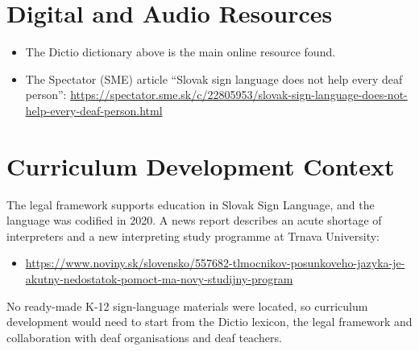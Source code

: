 \documentclass[12pt]{article}
\begin{document}
\section{Digital and Audio Resources}
\begin{itemize}
\item The Dictio dictionary above is the main online resource found.
\item The Spectator (SME) article ``Slovak sign language does not help every deaf person'': \url{https://spectator.sme.sk/c/22805953/slovak-sign-language-does-not-help-every-deaf-person.html}
\end{itemize}

\section{Curriculum Development Context}
The legal framework supports education in Slovak Sign Language, and the language was codified in 2020. A news report describes an acute shortage of interpreters and a new interpreting study programme at Trnava University:
\begin{itemize}
\item \url{https://www.noviny.sk/slovensko/557682-tlmocnikov-posunkoveho-jazyka-je-akutny-nedostatok-pomoct-ma-novy-studijny-program}
\end{itemize}
No ready-made K-12 sign-language materials were located, so curriculum development would need to start from the Dictio lexicon, the legal framework and collaboration with deaf organisations and deaf teachers.
\end{document}

